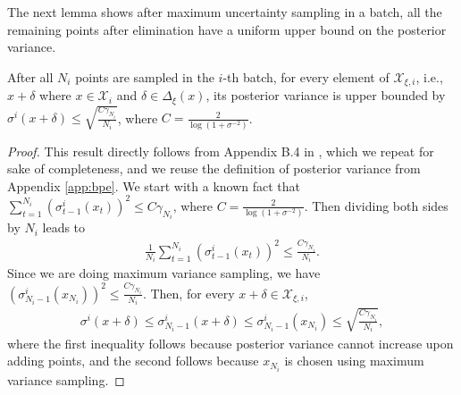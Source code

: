 \documentclass[10pt]{article}
\begin{document}
The next lemma shows after maximum uncertainty sampling in a batch, all the remaining points after elimination have a uniform upper bound on the posterior variance.
\begin{lemma}
    \label{lem:aux_robust_posterior_variance}
    After all $N_i$ points are sampled in the $i$-th batch,
    for every element of $\mathcal{X}_{\xi,i}$, i.e., $x+\delta$ where $x\in \mathcal{X}_i$ and $\delta\in\Delta_\xi(x)$,
    its posterior variance is upper bounded by $\sigma^i(x+\delta) \leq \sqrt{\frac{C\gamma_{N_i}}{N_i}} $, where $C = \frac{2}{\log(1+\sigma^{-2})} $.
\end{lemma}
\begin{proof}
    This result directly follows from Appendix B.4 in \citep{Cai21b}, which we repeat for sake of completeness, and we reuse the definition of posterior variance from Appendix \ref{app:bpe}.
    We start with a known fact \citep{Srinivas10, Garnett23} that $\sum_{t=1}^{N_i} (\sigma^i_{t-1}(x_t))^2 \leq C \gamma_{N_i} $, where $C = \frac{2}{\log(1+\sigma^{-2})}$. 
    Then dividing both sides by $N_i$ leads to 
    \begin{align}
        \frac{1}{N_i}\sum_{t=1}^{N_i} (\sigma^i_{t-1}(x_t))^2 \leq \frac{C \gamma_{N_i}}{N_i}.
    \end{align}
    Since we are doing maximum variance sampling, we have $(\sigma^i_{N_i-1}(x_{N_i}))^2 \leq \frac{C \gamma_{N_i}}{N_i}$. Then, for every $x+\delta\in\mathcal{X}_{\xi, i}$,
    \begin{align}
        \sigma^i (x+\delta) \leq \sigma^i_{N_{i}-1}(x+\delta) \leq \sigma^i_{N_{i}-1}(x_{N_i}) \leq \sqrt{\frac{C \gamma_{N_i}}{N_i}},
    \end{align}
    where the first inequality follows because posterior variance cannot increase upon adding points, and the second follows because $x_{N_i}$ is chosen using maximum variance sampling.
\end{proof}
\end{document}
